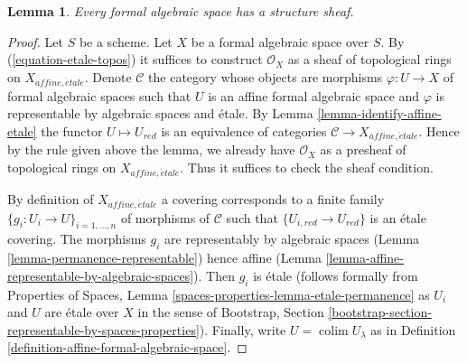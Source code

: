 \documentclass{stacks-project}
\theoremstyle{plain}
\newtheorem{lemma}[subsection]{Lemma}
\theoremstyle{definition}
\theoremstyle{remark}
\numberwithin{equation}{subsection}
\def\colim{\mathop{\mathrm{colim}}\nolimits}
\def\etale{{\acute{e}tale}}
\begin{document}
\begin{lemma}
\label{lemma-structure-sheaf}
Every formal algebraic space has a structure sheaf.
\end{lemma}

\begin{proof}
Let $S$ be a scheme. Let $X$ be a formal algebraic space over $S$.
By (\ref{equation-etale-topos}) it suffices to construct $\mathcal{O}_X$
as a sheaf of topological rings on $X_{affine, \etale}$.
Denote $\mathcal{C}$ the category whose objects
are morphisms $\varphi : U \to X$ of formal algebraic spaces such that
$U$ is an affine formal algebraic space and
$\varphi$ is representable by algebraic spaces and \'etale.
By Lemma \ref{lemma-identify-affine-etale}
the functor $U \mapsto U_{red}$ is an equivalence of categories
$\mathcal{C} \to X_{affine, \etale}$. Hence by the rule given
above the lemma, we already have $\mathcal{O}_X$ as a presheaf of
topological rings on $X_{affine, \etale}$. Thus it suffices to check
the sheaf condition.

\medskip\noindent
By definition of $X_{affine, \etale}$ a covering corresponds to a finite
family $\{g_i : U_i \to U\}_{i = 1, \ldots, n}$ of morphisms of $\mathcal{C}$
such that $\{U_{i, red} \to U_{red}\}$ is an \'etale covering.
The morphisms $g_i$ are representably by algebraic spaces
(Lemma \ref{lemma-permanence-representable}) hence affine
(Lemma \ref{lemma-affine-representable-by-algebraic-spaces}).
Then $g_i$ is \'etale (follows formally from
Properties of Spaces, Lemma \ref{spaces-properties-lemma-etale-permanence}
as $U_i$ and $U$ are \'etale over $X$ in the sense of
Bootstrap, Section \ref{bootstrap-section-representable-by-spaces-properties}).
Finally, write $U = \colim U_\lambda$ as in
Definition \ref{definition-affine-formal-algebraic-space}.


\end{proof}
\end{document}
